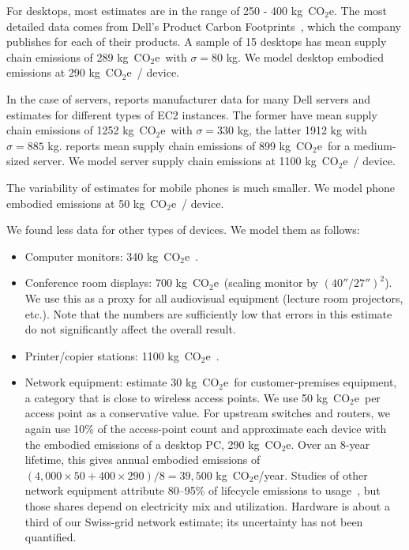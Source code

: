 \documentclass[11pt]{article}
\let\cite\parencite
\newcommand{\coe}{CO$_2$e}
\newcommand{\gcoe}{g~\coe}
\newcommand{\kgcoe}{k\gcoe}
\begin{document}
For desktops, most estimates are in the range of 250 - 400 \kgcoe. The most
detailed data comes from Dell's Product Carbon Footprints~\cite{dellpcf}, which
the company publishes for each of their products. A sample of 15 desktops has
mean supply chain emissions of 289 \kgcoe\ with $\sigma = 80$ kg. We model
desktop embodied emissions at 290 \kgcoe\ / device.

In the case of servers, \textcite{davy2021} reports manufacturer data for many
Dell servers and estimates for different types of EC2 instances. The former have
mean supply chain emissions of 1252 \kgcoe\ with $\sigma = 330$ kg, the latter
1912 kg with $\sigma = 885$ kg. \textcite{boavizta:api} reports mean supply
chain emissions of 899 \kgcoe\ for a medium-sized server. We model server supply
chain emissions at 1100 \kgcoe\ / device.

The variability of estimates for mobile phones is much smaller. We model phone
embodied emissions at 50 \kgcoe\ / device.

We found less data for other types of devices. We model them as follows:

\begin{itemize}
  \item Computer monitors: 340 \kgcoe~\cite{dellpcf,lovehagen2023,teehan2013}.
  \item Conference room displays: 700 \kgcoe\ (scaling monitor by
  $(40''/27'')^2$). We use this as a proxy for all audiovisual equipment
  (lecture room projectors, etc.). Note that the numbers are sufficiently low
  that errors in this estimate do not significantly affect the overall result.
  \item Printer/copier stations: 1100 \kgcoe~\cite{ecoinvent}.
  \item Network equipment: \textcite{lovehagen2023} estimate 30 \kgcoe\ for
  customer-premises equipment, a category that is close to wireless access
  points. We use 50 \kgcoe\ per access point as a conservative value. For
  upstream switches and routers, we again use 10\% of the access-point count and
  approximate each device with the embodied emissions of a desktop PC, 290
  \kgcoe. Over an 8-year lifetime, this gives annual embodied emissions of
  $(4{,}000 \times 50 + 400 \times 290) / 8 = 39{,}500$ \kgcoe/year.
  Studies of other network equipment attribute 80--95\% of lifecycle emissions
  to usage~\cite{cisco2024,jacob2023}, but those shares depend on electricity mix
  and utilization. Hardware is about a third of our Swiss-grid network estimate;
  its uncertainty has not been quantified.
\end{itemize}
\end{document}
